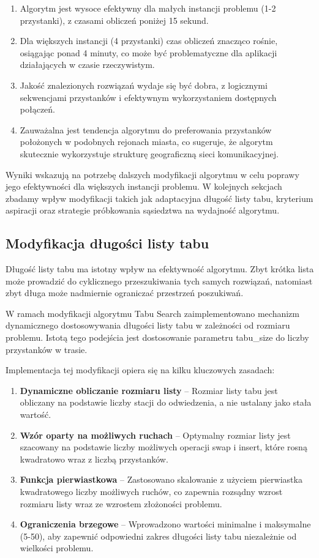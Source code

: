 \documentclass[12pt,a4paper]{article}
\begin{document}
\begin{enumerate}
    \item Algorytm jest wysoce efektywny dla małych instancji problemu (1-2 przystanki), z czasami obliczeń poniżej 15 sekund.
    \item Dla większych instancji (4 przystanki) czas obliczeń znacząco rośnie, osiągając ponad 4 minuty, co może być problematyczne dla aplikacji działających w czasie rzeczywistym.
    \item Jakość znalezionych rozwiązań wydaje się być dobra, z logicznymi sekwencjami przystanków i efektywnym wykorzystaniem dostępnych połączeń.
    \item Zauważalna jest tendencja algorytmu do preferowania przystanków położonych w podobnych rejonach miasta, co sugeruje, że algorytm skutecznie wykorzystuje strukturę geograficzną sieci komunikacyjnej.
\end{enumerate}

Wyniki wskazują na potrzebę dalszych modyfikacji algorytmu w celu poprawy jego efektywności dla większych instancji problemu. W kolejnych sekcjach zbadamy wpływ modyfikacji takich jak adaptacyjna długość listy tabu, kryterium aspiracji oraz strategie próbkowania sąsiedztwa na wydajność algorytmu.

\subsection{Modyfikacja długości listy tabu}
Długość listy tabu ma istotny wpływ na efektywność algorytmu. Zbyt krótka lista może prowadzić do cyklicznego przeszukiwania tych samych rozwiązań, natomiast zbyt długa może nadmiernie ograniczać przestrzeń poszukiwań.

W ramach modyfikacji algorytmu Tabu Search zaimplementowano mechanizm dynamicznego dostosowywania długości listy tabu w zależności od rozmiaru problemu. Istotą tego podejścia jest dostosowanie parametru tabu\_size do liczby przystanków w trasie.

Implementacja tej modyfikacji opiera się na kilku kluczowych zasadach:

\begin{enumerate}
    \item \textbf{Dynamiczne obliczanie rozmiaru listy} -- Rozmiar listy tabu jest obliczany na podstawie liczby stacji do odwiedzenia, a nie ustalany jako stała wartość.
    
    \item \textbf{Wzór oparty na możliwych ruchach} -- Optymalny rozmiar listy jest szacowany na podstawie liczby możliwych operacji swap i insert, które rosną kwadratowo wraz z liczbą przystanków.
    
    \item \textbf{Funkcja pierwiastkowa} -- Zastosowano skalowanie z użyciem pierwiastka kwadratowego liczby możliwych ruchów, co zapewnia rozsądny wzrost rozmiaru listy wraz ze wzrostem złożoności problemu.
    
    \item \textbf{Ograniczenia brzegowe} -- Wprowadzono wartości minimalne i maksymalne (5-50), aby zapewnić odpowiedni zakres długości listy tabu niezależnie od wielkości problemu.
\end{enumerate}
\end{document}
